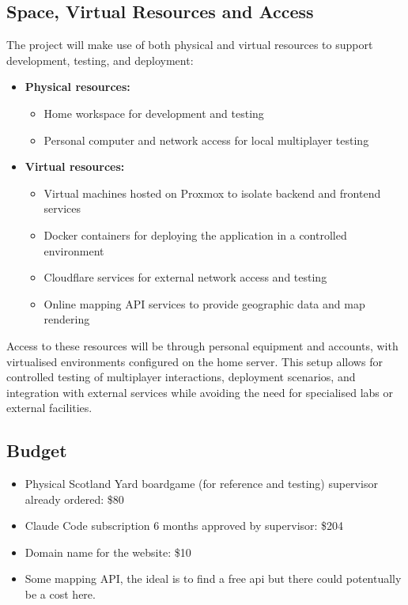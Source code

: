 \documentclass[11pt, a4paper, twoside, openright]{article}
\begin{document}
	\subsection{Space, Virtual Resources and Access}
	
	The project will make use of both physical and virtual resources to support development, testing, and deployment:
	
	\begin{itemize}
		\item \textbf{Physical resources:}
		\begin{itemize}
			\item Home workspace for development and testing
			\item Personal computer and network access for local multiplayer testing
		\end{itemize}
		
		\item \textbf{Virtual resources:}
		\begin{itemize}
			\item Virtual machines hosted on Proxmox to isolate backend and frontend services
			\item Docker containers for deploying the application in a controlled environment
			\item Cloudflare services for external network access and testing
			\item Online mapping API services to provide geographic data and map rendering
		\end{itemize}
	\end{itemize}
	
	Access to these resources will be through personal equipment and accounts, with virtualised environments configured on the home server. This setup allows for controlled testing of multiplayer interactions, deployment scenarios, and integration with external services while avoiding the need for specialised labs or external facilities.
	
	\subsection{Budget}
	
	\begin{itemize}
		\item Physical Scotland Yard boardgame (for reference and testing) supervisor already ordered: \$80
		\item Claude Code subscription 6 months approved by supervisor: \$204
		\item Domain name for the website: \$10
		\item Some mapping API, the ideal is to find a free api but there could potentually be a cost here.
	\end{itemize}
	
\end{document}
